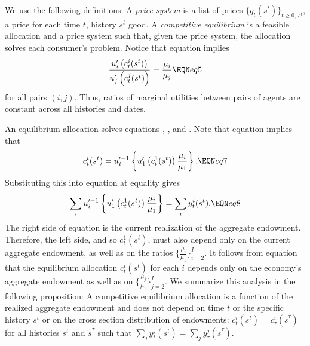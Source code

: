 We use the following  definitions:
\medskip
{} A {\it price system} is a list of
prices $\{q_t(s^t)\}_{t\geq0,\,s^t}$, a price for each 
time $t$, history $s^t$ good. 
\medskip
{} A {\it competitive equilibrium} is
a feasible allocation and a price system such that, given
the price system,  the allocation solves
each consumer's problem.
\medskip
Notice that equation  implies
$$ {u'_i\left(c_t^i(s^t)\right) \over
 u'_j\left(c_t^j(s^t)\right) }
 = {\mu_i\over \mu_j}          \EQN eq5 $$
for all pairs $(i,j)$.
Thus, ratios of marginal utilities between pairs of agents are
constant across all histories and dates.


An equilibrium allocation solves equations  ,  ,
and . Note that equation  implies that
$$ c_t^i(s^t) = u^{\prime -1}_i  
  \left\{u'_1\left(c_t^1(s^t)\right) {\mu_i \over \mu_1}
 \right\}. \EQN eq7 $$
Substituting this into equation  at equality gives
$$ \sum_i
u^{\prime -1}_i  \left\{u'_1\left(c_t^1(s^t)\right) 
{\mu_i \over \mu_1}\right\} =
       \sum_i y_t^i(s^t) .  \EQN eq8 $$
The right side of equation  is the current realization of
the aggregate endowment. %
Therefore, the left
side, and  so $c_t^1(s^t)$,  must also depend only on the current
aggregate endowment, as well as on the ratios
$\{ {\frac{\mu_i}{\mu_1}} \}_{i=2}^I$.  It follows from equation  that the
equilibrium allocation $c_t^i(s^t)$ for each $i$ depends only on
the economy's aggregate endowment as well as on
$\{ {\frac{\mu_j}{\mu_1}} \}_{j=2}^I$. We summarize this analysis  in
the following proposition:
\medskip
{}  A competitive equilibrium allocation
is a function of the realized aggregate endowment and does not depend
on time $t$ or the specific history $s^t$ or on
the cross section distribution of endowments:
$c_t^i(s^t)=c_\tau^i(\tilde s^{\tau})$ for all histories $s^t$ and $\tilde
s^{\tau}$ such that $\sum_j y_t^j(s^t) = \sum_j y_\tau^j(\tilde
s^{\tau})$.


\medskip








